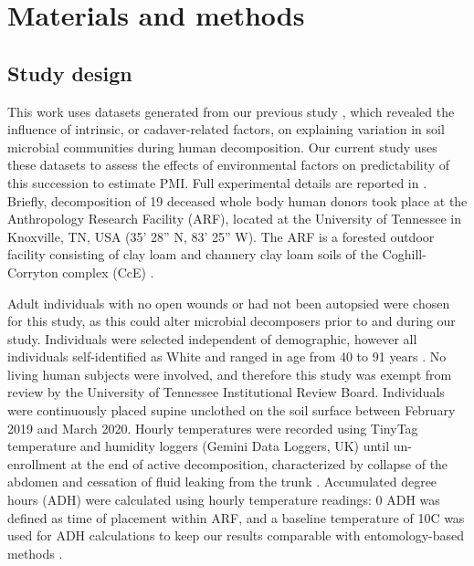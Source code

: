 \documentclass[
  10pt,
  letterpaper,
]{article}
\begin{document}
\hypertarget{materials-and-methods}{%
\section{Materials and methods}\label{materials-and-methods}}

\hypertarget{study-design}{%
\subsection{Study design}\label{study-design}}

This work uses datasets generated from our previous study
\citep{mason_body_2022}, which revealed the influence of intrinsic, or
cadaver-related factors, on explaining variation in soil microbial
communities during human decomposition. Our current study uses these
datasets to assess the effects of environmental factors on
predictability of this succession to estimate PMI. Full experimental
details are reported in \citep{mason_body_2022}. Briefly, decomposition
of 19 deceased whole body human donors took place at the Anthropology
Research Facility (ARF), located at the University of Tennessee in
Knoxville, TN, USA (35' 28'' N, 83' 25'' W).
The ARF is a forested outdoor facility consisting of clay loam and
channery clay loam soils of the Coghill-Corryton complex (CcE)
\citep{mason_body_2022, keenan_spatial_2018, damann_potential_2015}.

Adult individuals with no open wounds or had not been autopsied were
chosen for this study, as this could alter microbial decomposers prior
to and during our study. Individuals were selected independent of
demographic, however all individuals self-identified as White and ranged
in age from 40 to 91 years \citep{mason_body_2022}. No living human
subjects were involved, and therefore this study was exempt from review
by the University of Tennessee Institutional Review Board. Individuals
were continuously placed supine unclothed on the soil surface between
February 2019 and March 2020. Hourly temperatures were recorded using
TinyTag temperature and humidity loggers (Gemini Data Loggers, UK) until
un-enrollment at the end of active decomposition, characterized by
collapse of the abdomen and cessation of fluid leaking from the trunk
\citep{mason_body_2022, megyesi_using_2005}. Accumulated degree hours
(ADH) were calculated using hourly temperature readings: 0 ADH was
defined as time of placement within ARF, and a baseline temperature of
10\textdegree C was used for ADH calculations to keep our results
comparable with entomology-based methods \citep{byrd_development_2001}.
\end{document}
